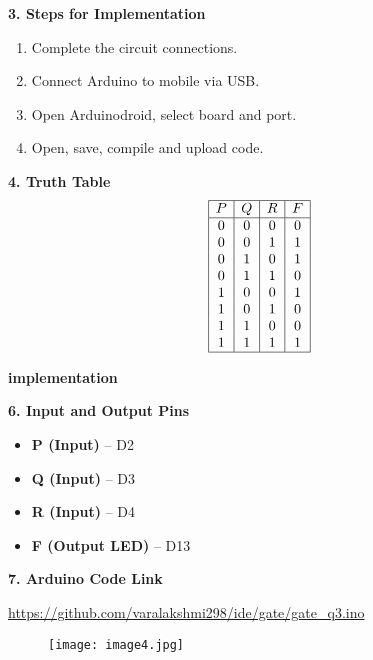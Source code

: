\documentclass[12pt]{article}
\begin{document}
\begin{multicols}{2}
\vspace{1em}
\noindent\textbf{3. Steps for Implementation}
\begin{enumerate}
    \item Complete the circuit connections.
    \item Connect Arduino to mobile via USB.
    \item Open Arduinodroid, select board and port.
    \item Open, save, compile and upload code.
\end{enumerate}

\vspace{1em}
\noindent\textbf{4. Truth Table}
\[
\begin{array}{|c|c|c|c|}
\hline
P & Q & R & F \\
\hline
0 & 0 & 0 & 0 \\
0 & 0 & 1 & 1 \\
0 & 1 & 0 & 1 \\
0 & 1 & 1 & 0 \\
1 & 0 & 0 & 1 \\
1 & 0 & 1 & 0 \\
1 & 1 & 0 & 0 \\
1 & 1 & 1 & 1 \\
\hline
\end{array}
\]

\end{multicols}


\vspace{1em}
\noindent\textbf{implementation}

\noindent
{}



\vspace{1em}
\noindent\textbf{6. Input and Output Pins}
\begin{flushleft}
\begin{itemize}
    \item \textbf{P (Input)} – D2
    \item \textbf{Q (Input)} – D3
    \item \textbf{R (Input)} – D4
    \item \textbf{F (Output LED)} – D13
\end{itemize}

\end{flushleft}

\vspace{1em}
\noindent\textbf{7. Arduino Code Link}

\noindent
\url{https://github.com/varalakshmi298/ide/gate/gate_q3.ino}

\vspace{1em}
\begin{figure}[H]
\texttt{[image: image4.jpg]}
\end{figure}
\end{document}
